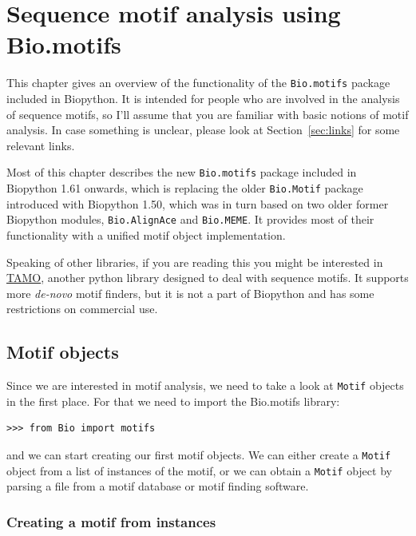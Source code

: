 \documentclass{report}
\begin{document}
\chapter{Sequence motif analysis using Bio.motifs}

This chapter gives an overview of the functionality of the
\verb|Bio.motifs| package included in Biopython. It is intended
for people who are involved in the analysis of sequence motifs, so I'll
assume that you are familiar with basic notions of motif analysis. In
case something is unclear, please look at Section~\ref{sec:links}
for some relevant links.

Most of this chapter describes the new \verb|Bio.motifs| package included
in Biopython 1.61 onwards, which is replacing the older \verb|Bio.Motif| package
introduced with Biopython 1.50, which was in turn based on two older former
Biopython modules, \verb|Bio.AlignAce| and \verb|Bio.MEME|. It provides
most of their functionality with a unified motif object implementation.

Speaking of other libraries, if you are reading this you might be
interested in \href{http://fraenkel.mit.edu/TAMO/}{TAMO}, another python library
designed to deal with sequence motifs. It supports more \emph{de-novo}
motif finders, but it is not a part of Biopython and has some restrictions
on commercial use.

\section{Motif objects}
\label{sec:object}

Since we are interested in motif analysis, we need to take a look at
\verb|Motif| objects in the first place. For that we need to import 
the Bio.motifs library:
\begin{verbatim}
>>> from Bio import motifs
\end{verbatim}
and we can start creating our first motif objects. We can either create
a \verb+Motif+ object from a list of instances of the motif, or we can
obtain a \verb+Motif+ object by parsing a file from a motif database
or motif finding software.

\subsection{Creating a motif from instances}
\end{document}
